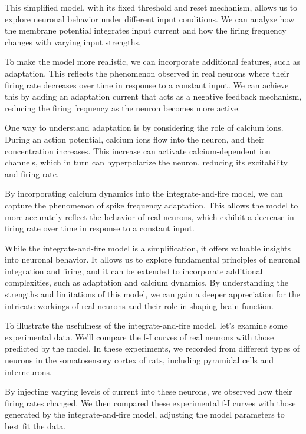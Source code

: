 This simplified model, with its fixed threshold and reset mechanism, allows us to explore neuronal behavior under different input conditions. We can analyze how the membrane potential integrates input current and how the firing frequency changes with varying input strengths.

To make the model more realistic, we can incorporate additional features, such as adaptation. This reflects the phenomenon observed in real neurons where their firing rate decreases over time in response to a constant input. We can achieve this by adding an adaptation current that acts as a negative feedback mechanism, reducing the firing frequency as the neuron becomes more active.

One way to understand adaptation is by considering the role of calcium ions. During an action potential, calcium ions flow into the neuron, and their concentration increases. This increase can activate calcium-dependent ion channels, which in turn can hyperpolarize the neuron, reducing its excitability and firing rate.

By incorporating calcium dynamics into the integrate-and-fire model, we can capture the phenomenon of spike frequency adaptation. This allows the model to more accurately reflect the behavior of real neurons, which exhibit a decrease in firing rate over time in response to a constant input.

While the integrate-and-fire model is a simplification, it offers valuable insights into neuronal behavior. It allows us to explore fundamental principles of neuronal integration and firing, and it can be extended to incorporate additional complexities, such as adaptation and calcium dynamics. By understanding the strengths and limitations of this model, we can gain a deeper appreciation for the intricate workings of real neurons and their role in shaping brain function.

To illustrate the usefulness of the integrate-and-fire model, let's examine some experimental data. We'll compare the f-I curves of real neurons with those predicted by the model. In these experiments, we recorded from different types of neurons in the somatosensory cortex of rats, including pyramidal cells and interneurons.

By injecting varying levels of current into these neurons, we observed how their firing rates changed. We then compared these experimental f-I curves with those generated by the integrate-and-fire model, adjusting the model parameters to best fit the data.

